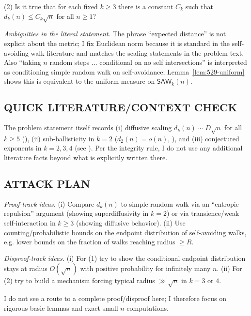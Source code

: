 (2) Is it true that for each fixed $k\ge 3$ there is a constant $C_k$ such that $d_k(n)\le C_k\sqrt n$ for all $n\ge 1$?

\emph{Ambiguities in the literal statement.} The phrase ``expected distance'' is not explicit about the metric; I fix Euclidean norm because it is standard in the self-avoiding walk literature and matches the scaling statements in the problem text. Also ``taking $n$ random steps ... conditional on no self intersections'' is interpreted as conditioning simple random walk on self-avoidance; Lemma~\ref{lem:529-uniform} shows this is equivalent to the uniform measure on $\mathsf{SAW}_k(n)$.

\subsection*{QUICK LITERATURE/CONTEXT CHECK}
The problem statement itself records (i) diffusive scaling $d_k(n)\sim D\sqrt n$ for all $k\ge 5$ (\cite{Sl87,HaSl91,HaSl92}), (ii) sub-ballisticity in $k=2$ ($d_2(n)=o(n)$, \cite{DuHa13}), and (iii) conjectured exponents in $k=2,3,4$ (see \cite{MaSl93}). Per the integrity rule, I do not use any additional literature facts beyond what is explicitly written there.

\subsection*{ATTACK PLAN}
\emph{Proof-track ideas.}
(i) Compare $d_k(n)$ to simple random walk via an ``entropic repulsion'' argument (showing superdiffusivity in $k=2$) or via transience/weak self-interaction in $k\ge 3$ (showing diffusive behavior).
(ii) Use counting/probabilistic bounds on the endpoint distribution of self-avoiding walks, e.g. lower bounds on the fraction of walks reaching radius $\ge R$.

\emph{Disproof-track ideas.}
(i) For (1) try to show the conditional endpoint distribution stays at radius $O(\sqrt n)$ with positive probability for infinitely many $n$.
(ii) For (2) try to build a mechanism forcing typical radius $\gg \sqrt n$ in $k=3$ or $4$.

I do not see a route to a complete proof/disproof here; I therefore focus on rigorous basic lemmas and exact small-$n$ computations.

